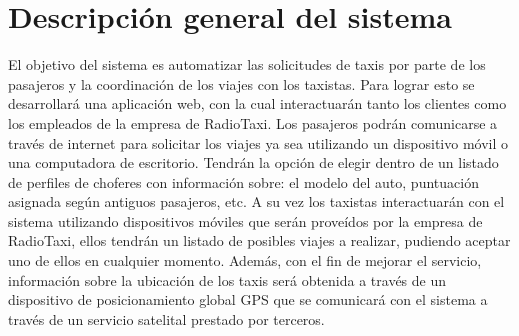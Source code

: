 
\lstset{escapechar=@,style=customc}




\fecha{\today}

\grupo{}


\maketitle

\tableofcontents
\newpage

\section{Descripción general del sistema}
El objetivo del sistema es automatizar las solicitudes de taxis por parte de los pasajeros y la coordinación de los viajes con los taxistas. Para lograr esto se desarrollará una aplicación web, con la cual interactuarán tanto los clientes como los empleados de la empresa de RadioTaxi. Los pasajeros podrán comunicarse a través de internet para solicitar los viajes ya sea utilizando un dispositivo móvil o una computadora de escritorio. Tendrán la opción de elegir dentro de un listado de perfiles de choferes con información sobre: el modelo del auto, puntuación asignada según antiguos pasajeros, etc. A su vez los taxistas interactuarán con el sistema utilizando dispositivos móviles que serán proveídos por la empresa de RadioTaxi, ellos tendrán un listado de posibles viajes a realizar, pudiendo aceptar uno de ellos en cualquier momento. Además, con el fin de mejorar el servicio, información sobre la ubicación de los taxis será obtenida a través de un dispositivo de posicionamiento global GPS que se comunicará con el sistema a través de un servicio satelital prestado por terceros.

